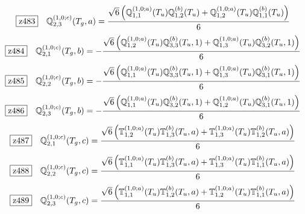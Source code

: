 \documentclass[fleqn,10pt,landscape]{jsarticle}
\begin{document}
\begin{dmath*}
\hspace*{3mm}\fbox{z483}\quad \mathbb{Q}_{2,3}^{(1,0;c)}(T_{g},a)=\frac{\sqrt{6} \left(\mathbb{Q}_{1,1}^{(1,0;a)}(T_{u}) \mathbb{Q}_{1,2}^{(b)}(T_{u}) + \mathbb{Q}_{1,2}^{(1,0;a)}(T_{u}) \mathbb{Q}_{1,1}^{(b)}(T_{u})\right)}{6}
\end{dmath*}
\begin{dmath*}
\hspace*{3mm}\fbox{z484}\quad \mathbb{Q}_{2,1}^{(1,0;c)}(T_{g},b)=- \frac{\sqrt{6} \left(\mathbb{Q}_{1,2}^{(1,0;a)}(T_{u}) \mathbb{Q}_{3,3}^{(b)}(T_{u},1) + \mathbb{Q}_{1,3}^{(1,0;a)}(T_{u}) \mathbb{Q}_{3,2}^{(b)}(T_{u},1)\right)}{6}
\end{dmath*}
\begin{dmath*}
\hspace*{3mm}\fbox{z485}\quad \mathbb{Q}_{2,2}^{(1,0;c)}(T_{g},b)=- \frac{\sqrt{6} \left(\mathbb{Q}_{1,1}^{(1,0;a)}(T_{u}) \mathbb{Q}_{3,3}^{(b)}(T_{u},1) + \mathbb{Q}_{1,3}^{(1,0;a)}(T_{u}) \mathbb{Q}_{3,1}^{(b)}(T_{u},1)\right)}{6}
\end{dmath*}
\begin{dmath*}
\hspace*{3mm}\fbox{z486}\quad \mathbb{Q}_{2,3}^{(1,0;c)}(T_{g},b)=- \frac{\sqrt{6} \left(\mathbb{Q}_{1,1}^{(1,0;a)}(T_{u}) \mathbb{Q}_{3,2}^{(b)}(T_{u},1) + \mathbb{Q}_{1,2}^{(1,0;a)}(T_{u}) \mathbb{Q}_{3,1}^{(b)}(T_{u},1)\right)}{6}
\end{dmath*}
\begin{dmath*}
\hspace*{3mm}\fbox{z487}\quad \mathbb{Q}_{2,1}^{(1,0;c)}(T_{g},c)=\frac{\sqrt{6} \left(\mathbb{T}_{1,2}^{(1,0;a)}(T_{u}) \mathbb{T}_{1,3}^{(b)}(T_{u},a) + \mathbb{T}_{1,3}^{(1,0;a)}(T_{u}) \mathbb{T}_{1,2}^{(b)}(T_{u},a)\right)}{6}
\end{dmath*}
\begin{dmath*}
\hspace*{3mm}\fbox{z488}\quad \mathbb{Q}_{2,2}^{(1,0;c)}(T_{g},c)=\frac{\sqrt{6} \left(\mathbb{T}_{1,1}^{(1,0;a)}(T_{u}) \mathbb{T}_{1,3}^{(b)}(T_{u},a) + \mathbb{T}_{1,3}^{(1,0;a)}(T_{u}) \mathbb{T}_{1,1}^{(b)}(T_{u},a)\right)}{6}
\end{dmath*}
\begin{dmath*}
\hspace*{3mm}\fbox{z489}\quad \mathbb{Q}_{2,3}^{(1,0;c)}(T_{g},c)=\frac{\sqrt{6} \left(\mathbb{T}_{1,1}^{(1,0;a)}(T_{u}) \mathbb{T}_{1,2}^{(b)}(T_{u},a) + \mathbb{T}_{1,2}^{(1,0;a)}(T_{u}) \mathbb{T}_{1,1}^{(b)}(T_{u},a)\right)}{6}
\end{dmath*}
\end{document}
